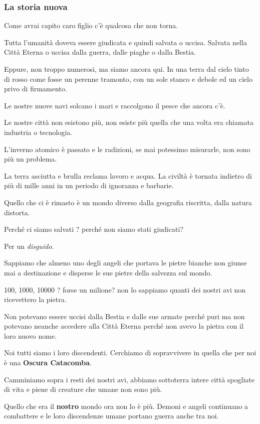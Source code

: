 \documentclass[12pt,a4paper,twoside,openany]{book}
\begin{document}
\begin{multicols}{2}
\subsubsection{La storia nuova}

Come avrai capito caro figlio c'è qualcosa che non torna.

Tutta l'umanità doveva essere giudicata e quindi salvata o uccisa. Salvata nella Città Eterna o uccisa dalla guerra, dalle piaghe o dalla Bestia.

Eppure, non troppo numerosi, ma siamo ancora qui. In una terra dal cielo tinto di rosso come fosse un perenne tramonto, con un sole stanco e debole ed un cielo privo di firmamento.

Le nostre nuove navi solcano i mari e raccolgono il pesce che ancora c'è.

Le nostre città non esistono più, non esiste più quella che una volta era chiamata industria o tecnologia.

L'inverno atomico è passato e le radizioni, se mai potessimo misurarle, non sono più un problema.

La terra asciutta e brulla reclama lavoro e acqua. La civiltà è tornata indietro di più di mille anni in un periodo di ignoranza e barbarie.

Quello che ci è rimasto è un mondo diverso dalla geografia riscritta, dalla natura distorta.

Perché ci siamo salvati ? perché non siamo stati giudicati?

Per un \textit{disguido}. 

Sappiamo che almeno uno degli angeli che portava le pietre bianche non giunse mai a destinazione e disperse le sue pietre della salvezza sul mondo.

100, 1000, 10000 ? forse un milione?  non lo sappiamo quanti dei nostri avi non ricevettero la pietra.

Non potevano essere uccisi dalla Bestia e dalle sue armate perché puri ma non potevano neanche accedere alla Città Eterna perché non avevo la pietra con il loro nuovo nome.

Noi tutti siamo i loro discendenti. Cerchiamo di sopravvivere in quella che per noi è una \textbf{Oscura Catacomba}.

Camminiamo sopra i resti dei nostri avi, abbiamo sottoterra intere città spogliate di vita e piene di creature che umane non sono più.

Quello che era il \textbf{nostro} mondo ora non lo è più. Demoni e angeli continuano a combattere e le loro discendenze umane portano guerra anche tra noi.


\end{multicols}
\end{document}
